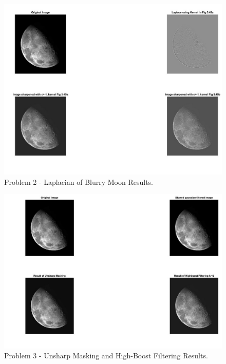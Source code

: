 \documentclass[./rarnold_report3.tex]{subfiles}
\begin{document}
	\clearpage
	
	\begin{figure}[!htbp]
	\centering
	\includegraphics[scale=0.50]{"moon_2"}
	\caption{Problem 2 - Laplacian of Blurry Moon Results.} 
	\label{moon2}
	\end{figure}
	
	\clearpage
	
	\begin{figure}[!htbp]
	\centering
	\includegraphics[scale=0.50]{"moon_3"}
	\caption{Problem 3 - Unsharp Masking and High-Boost Filtering Results.} 
	\label{moon3}
	\end{figure}
	
	\clearpage
	
\end{document}
